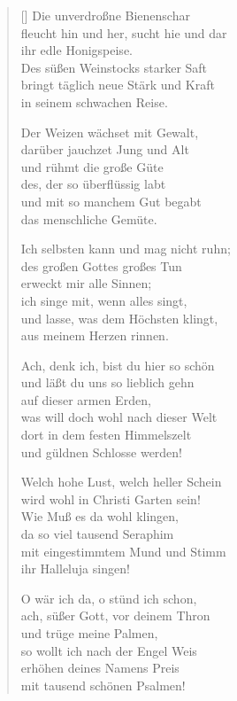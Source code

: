 \begin{multicols}{2}
\begin{verse}[\versewidth]
 Die unverdroßne Bienenschar\\
fleucht hin und her, sucht hie und dar\\
ihr edle Honigspeise.\\
Des süßen Weinstocks starker Saft\\
bringt täglich neue Stärk und Kraft\\
in seinem schwachen Reise.

 Der Weizen wächset mit Gewalt,\\
darüber jauchzet Jung und Alt\\
und rühmt die große Güte\\
des, der so überflüssig labt\\
und mit so manchem Gut begabt\\
das menschliche Gemüte.

 Ich selbsten kann und mag nicht ruhn;\\
des großen Gottes großes Tun\\
erweckt mir alle Sinnen;\\
ich singe mit, wenn alles singt,\\
und lasse, was dem Höchsten klingt,\\
aus meinem Herzen rinnen.

 Ach, denk ich, bist du hier so schön\\
und läßt du uns so lieblich gehn\\
auf dieser armen Erden,\\
was will doch wohl nach dieser Welt\\
dort in dem festen Himmelszelt\\
und güldnen Schlosse werden!

 Welch hohe Lust, welch heller Schein\\
wird wohl in Christi Garten sein!\\
Wie Muß es da wohl klingen,\\
da so viel tausend Seraphim\\
mit eingestimmtem Mund und Stimm\\
ihr Halleluja singen!

 O wär ich da, o stünd ich schon,\\
ach, süßer Gott, vor deinem Thron\\
und trüge meine Palmen,\\
so wollt ich nach der Engel Weis\\
erhöhen deines Namens Preis\\
mit tausend schönen Psalmen!


\end{verse}
\end{multicols}
